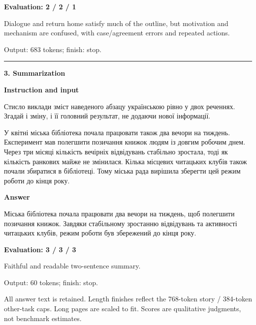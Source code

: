 \documentclass[10pt]{article}
\begin{document}
{\begin{minipage}{\textwidth}
\textbf{Evaluation: 2 / 2 / 1}\par Dialogue and return home satisfy much of the outline, but motivation and mechanism are confused, with case/agreement errors and repeated actions.
\par {\color{gray} Output: 683 tokens; finish: stop.}\par
\medskip\hrule\smallskip
{\bfseries 3. Summarization}\par\smallskip
\textbf{Instruction and input}\par Стисло виклади зміст наведеного абзацу українською рівно у двох реченнях. Згадай і зміну, і її головний результат, не додаючи нової інформації.
\par\smallskip
У квітні міська бібліотека почала працювати також два вечори на тиждень. Експеримент мав полегшити позичання книжок людям із довгим робочим днем. Через три місяці кількість вечірніх відвідувань стабільно зростала, тоді як кількість ранкових майже не змінилася. Кілька місцевих читацьких клубів також почали збиратися в бібліотеці. Тому міська рада вирішила зберегти цей режим роботи до кінця року.\par\smallskip
\textbf{Answer}\par Міська бібліотека почала працювати два вечори на тиждень, щоб полегшити позичання книжок. Завдяки стабільному зростанню відвідувань та активності читацьких клубів, режим роботи був збережений до кінця року.\par\smallskip
\textbf{Evaluation: 3 / 3 / 3}\par Faithful and readable two-sentence summary.
\par {\color{gray} Output: 60 tokens; finish: stop.}\par
\medskip\footnotesize All answer text is retained. Length finishes reflect the 768-token story / 384-token other-task caps. Long pages are scaled to fit. Scores are qualitative judgments, not benchmark estimates.
\end{minipage}}%
\noindent\ifdim\dimexpr\ht\languagepage+\dp\languagepage\relax>0.93\textheight%
\resizebox*{!}{0.93\textheight}{\usebox{\languagepage}}%
\else\usebox{\languagepage}\fi%
\end{document}
